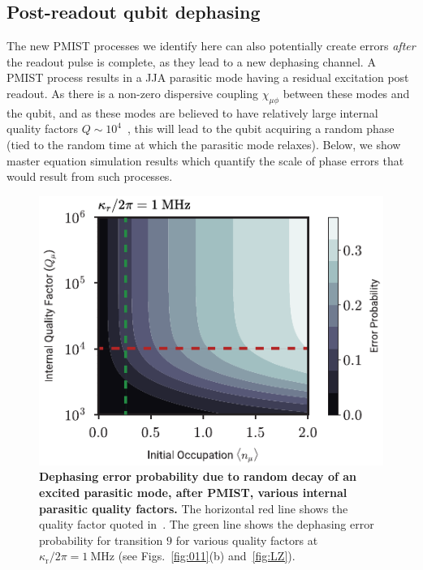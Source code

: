 \documentclass[%
reprint,
superscriptaddress,
 amsmath,amssymb,
 aps,
 prx,
longbibliography,
floatfix,
]{revtex4-2}
\begin{document}
\subsection{Post-readout qubit dephasing}\label{sec:dephasing}

The new PMIST processes we identify here can also potentially create errors \textit{after} the readout pulse is complete, as they lead to a new dephasing channel.  A PMIST process results in a JJA parasitic mode having a residual excitation post readout.  As there is a non-zero dispersive coupling 
$\chi_{\mu \phi}$ between these modes and the qubit, and as these modes are believed to have relatively large internal quality factors $Q\sim 10^{4}$~\cite{masluk_microwave_2012, masluk2013reducing}, this will lead to the qubit acquiring a random phase (tied to the random time at which the parasitic mode relaxes).  Below, we show master equation simulation results which quantify the
scale of phase errors that would result from such processes. 

\begin{figure}[htb]
    \centering
    \includegraphics[width=\linewidth]{Figures/dephasing.pdf}
    \caption{{\bf Dephasing error probability due to random decay of an excited parasitic mode, after PMIST, various internal parasitic quality factors.} The horizontal red line shows the quality factor quoted in~\cite{masluk_microwave_2012}. The green line shows the dephasing error probability for transition $9$ for various quality factors at $\kappa_\textrm{r}/2\pi=1 \ \mathrm{MHz}$ (see Figs.~\ref{fig:011}(b) and~\ref{fig:LZ}).}
    \label{fig:dephasing}
\end{figure}
\end{document}
